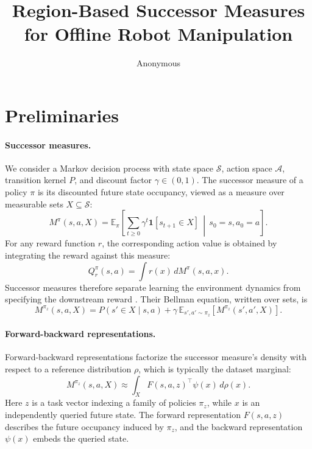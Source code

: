 \documentclass{article}
\title{Region-Based Successor Measures for Offline Robot Manipulation}
\author{Anonymous}
\newcommand{\E}{\mathbb{E}}
\newcommand{\ind}[1]{\mathbf{1}\!\left[#1\right]}
\begin{document}
\maketitle

\section{Preliminaries}
\label{sec:prelim}

\paragraph{Successor measures.}
We consider a Markov decision process with state space $\mathcal{S}$, action space $\mathcal{A}$, transition kernel $P$, and discount factor $\gamma\in(0,1)$.
The successor measure of a policy $\pi$ is its discounted future state occupancy, viewed as a measure over measurable sets $X\subseteq\mathcal{S}$:
\begin{equation}
\label{eq:sm}
M^{\pi}(s,a,X)
=
\E_{\pi}\!\left[
\sum_{t\ge0}\gamma^{t}\ind{s_{t+1}\in X}
\,\middle|\,
s_{0}=s,a_{0}=a
\right].
\end{equation}
For any reward function $r$, the corresponding action value is obtained by integrating the reward against this measure:
\begin{equation}
Q_r^{\pi}(s,a)=\int r(x)\,dM^{\pi}(s,a,x).
\end{equation}
Successor measures therefore separate learning the environment dynamics from specifying the downstream reward \citep{dayan1993improving,blier2021learning}.
Their Bellman equation, written over sets, is
\begin{equation}
\label{eq:density-bellman}
M^{\pi_z}(s,a,X)
=
P(s'\in X\mid s,a)
+
\gamma\,\E_{s',a'\sim\pi_z}\!\left[M^{\pi_z}(s',a',X)\right].
\end{equation}

\paragraph{Forward-backward representations.}
Forward-backward representations \citep{touati2021learning,touati2023does} factorize the successor measure's density with respect to a reference distribution $\rho$, which is typically the dataset marginal:
\begin{equation}
\label{eq:fb}
M^{\pi_z}(s,a,X)
\approx
\int_X F(s,a,z)^{\top}\psi(x)\,d\rho(x).
\end{equation}
Here $z$ is a task vector indexing a family of policies $\pi_z$, while $x$ is an independently queried future state.
The forward representation $F(s,a,z)$ describes the future occupancy induced by $\pi_z$, and the backward representation $\psi(x)$ embeds the queried state.
\end{document}
